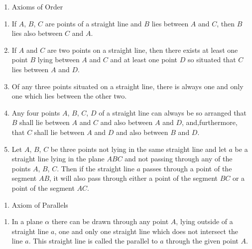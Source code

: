 \documentclass[
]{book}
\providecommand{\tightlist}{%
  \setlength{\itemsep}{0pt}\setlength{\parskip}{0pt}}
\theoremstyle{definition}
\theoremstyle{definition}
\theoremstyle{definition}
\theoremstyle{definition}
\theoremstyle{remark}
\begin{document}
\begin{enumerate}
\def\labelenumi{\Roman{enumi}.}
\setcounter{enumi}{1}
\tightlist
\item
  Axioms of Order
\end{enumerate}

\begin{enumerate}
\def\labelenumi{\arabic{enumi}.}
\item
  If \(A\), \(B\), \(C\) are points of a straight line and \(B\) lies between \(A\) and \(C\), then \(B\) lies also between \(C\) and \(A\).
\item
  If \(A\) and \(C\) are two points on a straight line, then there exists at least one point \(B\) lying between \(A\) and \(C\) and at least one point \(D\) so situated that \(C\) lies between \(A\) and \(D\).
\item
  Of any three points situated on a straight line, there is always one and only one which lies between the other two.
\item
  Any four points \(A\), \(B\), \(C\), \(D\) of a straight line can always be so arranged that \(B\) shall lie between \(A\) and \(C\) and also between \(A\) and \(D\), and,furthermore, that \(C\) shall lie between \(A\) and \(D\) and also between \(B\) and \(D\).
\item
  Let \(A\), \(B\), \(C\) be three points not lying in the same straight line and let \(a\) be a straight line lying in the plane \(ABC\) and not passing through any of the points \(A\), \(B\), \(C\). Then if the straight line \(a\) passes through a point of the segment \(AB\), it will also pass through either a point of the segment \(BC\) or a point of the segment \(AC\).
\end{enumerate}

\begin{enumerate}
\def\labelenumi{\Roman{enumi}.}
\setcounter{enumi}{2}
\tightlist
\item
  Axiom of Parallels
\end{enumerate}

\begin{enumerate}
\def\labelenumi{\arabic{enumi}.}
\tightlist
\item
  In a plane \(\alpha\) there can be drawn through any point \(A\), lying outside of a straight line \(a\), one and only one straight line which does not intersect the line \(a\). This straight line is called the parallel to \(a\) through the given point \(A\).
\end{enumerate}
\end{document}
